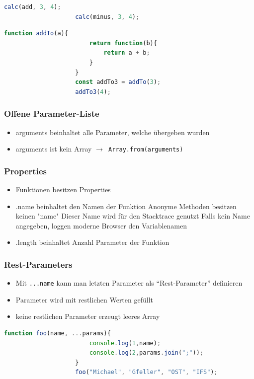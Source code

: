 \documentclass[a4paper, landscape, 8pt]{scrartcl}
\begin{document}
\begin{multicols*}{4}
\begin{lstlisting}[language=JavaScript]
                    calc(add, 3, 4);
                    calc(minus, 3, 4);
        \end{lstlisting}
        \begin{lstlisting}[language=JavaScript]
                    function addTo(a){
                        return function(b){
                            return a + b;
                        }
                    }
                    const addTo3 = addTo(3);
                    addTo3(4);
        \end{lstlisting}
        
        \subsubsection{Offene Parameter-Liste}
        \begin{itemize}
            \item arguments beinhaltet alle Parameter, welche übergeben wurden
            \item arguments ist kein Array
            \subitem \texttt{$\to$ Array.from(arguments)}
        \end{itemize}

        \subsubsection{Properties}
        \begin{itemize}
            \item Funktionen besitzen Properties
            \item .name beinhaltet den Namen der Funktion
            \subitem Anonyme Methoden besitzen keinen "name"
            \subitem Dieser Name wird für den Stacktrace genutzt
            \subitem Falls kein Name angegeben, loggen moderne Browser den Variablenamen
            \item .length beinhaltet Anzahl Parameter der Funktion
        \end{itemize}

        \subsubsection{Rest-Parameters}
        \begin{itemize}
            \item Mit \texttt{...name} kann man letzten Parameter als \enquote{Rest-Parameter} definieren
            \item Parameter wird mit restlichen Werten gefüllt
            \item keine restlichen Parameter erzeugt leeres Array
        \end{itemize}
        \begin{lstlisting}[language=JavaScript]
                    function foo(name, ...params){
                        console.log(1,name);
                        console.log(2,params.join(";"));
                    }
                    foo("Michael", "Gfeller", "OST", "IFS");
        \end{lstlisting}


\end{multicols*}
\end{document}
